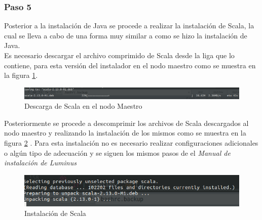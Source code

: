 \subsubsection{Paso 5}
Posterior a la instalación de Java se procede a realizar la instalación de Scala, la cual se lleva a cabo de una forma muy similar a como se hizo la instalación de Java.
\\ 
Es necesario descargar el archivo comprimido de Scala desde la liga que lo contiene, para esta versión del instalador en el nodo maestro como se muestra en la figura \ref{fig:descarga}. 
\begin{figure}[H]
	\hypertarget{fig:descarga}{\hspace{1pt}}
	\begin{center}	
		\includegraphics[width=.7\textwidth]{capitulo5/images/descargascala.png}
		\caption{Descarga de Scala en el nodo Maestro}
		\label{fig:descarga}
	\end{center}
\end{figure}
Posteriormente se procede a descomprimir los archivos de Scala descargados al nodo maestro y realizando la instalación de los mismos como se muestra en la figura \ref{fig:scala} .
Para esta instalación no es necesario realizar configuraciones adicionales o algún tipo de adecuación y se siguen los mismos pasos de el \emph{Manual de instalación de Luminus}
\begin{figure}[H]
	\hypertarget{fig:scala}{\hspace{1pt}}
	\begin{center}	
		\includegraphics[width=.7\textwidth]{capitulo5/images/instalacionscalam.png}
		\caption{Instalación de Scala}
		\label{fig:scala}
	\end{center}
\end{figure}
